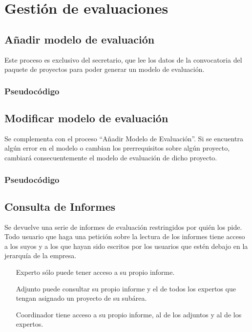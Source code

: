 \documentclass[12pt,a4paper,titlepage,spanish,twoside]{book}
\begin{document}
\section{Gestión de evaluaciones}

\subsection{Añadir modelo de evaluación}
Este proceso es exclusivo del secretario, que lee los datos de la convocatoria 
del paquete de proyectos para poder generar un modelo de evaluación.

\subsubsection{Pseudocódigo}


\subsection{Modificar modelo de evaluación}
Se complementa con el proceso ``Añadir Modelo de Evaluación''. Si se encuentra 
algún error en el modelo o cambian los prerrequisitos sobre algún proyecto,  
cambiará consecuentemente el modelo de evaluación de dicho proyecto.

\subsubsection{Pseudocódigo}


\subsection{Consulta de Informes}
Se devuelve una serie de informes de evaluación restringidos por quién los pide.
Todo usuario que haga una petición sobre la lectura de los informes tiene 
acceso a los suyos y a los que hayan sido escritos por los usuarios que estén 
debajo en la jerarquía de la empresa.
\begin{itemize}
\item[Experto] sólo puede tener acceso a su propio informe.
\item[Adjunto] puede consultar su propio informe y el de todos los expertos que 
tengan asignado un proyecto de su subárea.
\item[Coordinador] tiene acceso a su propio informe, al de los adjuntos y al de 
los expertos.
\end{itemize}
\end{document}
